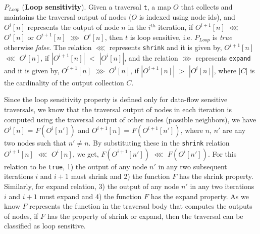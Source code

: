 \begin{definition}\label{def:loop-sensitivity}
$P_{Loop}$ (\textbf{Loop sensitivity}). Given a traversal \lstinline|t|, a map
$O$ that collects and maintains the traversal output of nodes ($O$ is indexed
using node ids), and $O^i[n]$ represents the output of node $n$ in the $i^{th}$
iteration, if $O^{i+1}[n]$ $\lll$ $O^{i}[n]$ or $O^{i+1}[n]$ $\ggg$ $O^{i}[n]$,
then $t$ is loop sensitive, i.e. $P_{Loop}$ is \textit{true} otherwise
\textit{false}.
The relation $\lll$ represents \lstinline|shrink| and it is given by,
$O^{i+1}[n]$ $\lll$ $O^{i}[n]$, if $|O^{i+1}[n]|$ $<$ $|O^{i}[n]|$, and the
relation $\ggg$ represents \lstinline|expand| and it is given by, $O^{i+1}[n]$
$\ggg$ $O^{i}[n]$, if $|O^{i+1}[n]|$ $>$ $|O^{i}[n]|$, where $|C|$ is the
cardinality of the output collection $C$.
\end{definition}

Since the loop sensitivity property is defined only for data-flow sensitive
traversals, we know that the traversal output of nodes in each iteration is
computed using the traversal output of other nodes (possible neighbors), we have
$O^{i}[n]$ = $F(O^{i}[n'])$ and $O^{i+1}[n]$ = $F(O^{i+1}[n'])$, where $n$, $n'$
are any two nodes such that $n' \neq n$. By substituting these in the
\lstinline|shrink| relation $O^{i+1}[n]$ $\lll$ $O^{i}[n]$, we get,
$F(O^{i+1}[n'])$ $\lll$ $F(O^{i}[n'])$. For this relation to be
\lstinline|true|, 1) the output of any node $n'$ in any two subsequent
iterations $i$ and $i+1$ must shrink and 2) the function $F$ has the shrink
property. Similarly, for expand relation, 3) the output of any node $n'$ in any
two iterations $i$ and $i+1$ must expand and 4) the function $F$ has the expand
property.
As we know $F$ represents the function in the traversal body that computes the
outputs of nodes, if $F$ has the property of shrink or expand, then the
traversal can be classified as loop sensitive.
% 
% 
% 
% 

